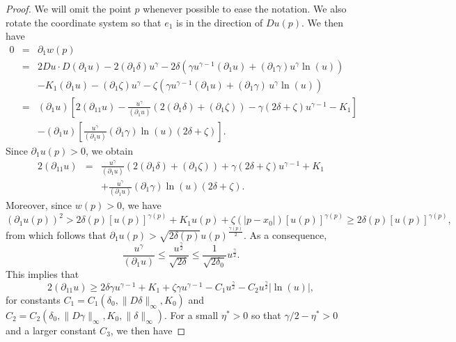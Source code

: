 \documentclass[reqno,11pt]{amsart}
\newcommand{\1}{\mathds{1}}
\numberwithin{equation}{section}
\begin{document}
\begin{proof}
We will omit the point $p$ whenever possible to ease the notation. We also rotate the coordinate system so that $e_1$ is in the direction of $Du(p)$. We then have
\begin{eqnarray*}
    0 & = & \partial_1 w(p)  \\
      & = &  2Du \cdot D\left(\partial_1u\right) - 2\left(\partial_1\delta\right) u^{\gamma} - 2\delta \left(\gamma u^{\gamma-1}\left(\partial_1u\right) + \left(\partial_1\gamma\right) u^\gamma \ln(u) \right) \\
      &  & - K_1\left(\partial_1u\right) - \left(\partial_1\zeta\right) u^\gamma - \zeta\left(\gamma u^{\gamma-1}\left(\partial_1u\right) + \left(\partial_1\gamma\right)\,u^\gamma \ln(u) \right)\\
      & = &   \left(\partial_1 u\right)\left[2\left(\partial_{11}u\right) - \frac{u^\gamma}{\left(\partial_1 u\right)}(2\left(\partial_1 \delta\right) + \left(\partial_1 \zeta\right)) - \gamma(2\delta + \zeta)u^{\gamma - 1} - K_1\right]\\
      & & -  \left(\partial_1 u\right) \left[ \frac{u^\gamma}{\left(\partial_1 u\right)}\left(\partial_1 \gamma\right) \ln(u)(2\delta  + \zeta)\right].
\end{eqnarray*}
Since $\partial_1u(p) >0$, we obtain
\begin{eqnarray*}
    2\left(\partial_{11}u\right) & = &\frac{u^\gamma}{\left(\partial_1 u\right)}(2\left(\partial_1\delta\right) + \left(\partial_1 \zeta\right)) + \gamma(2\delta + \zeta)u^{\gamma - 1} + K_1\\
    & & + \frac{u^\gamma}{\left(\partial_1 u\right)}\left(\partial_1 \gamma\right) \ln(u)(2\delta  + \zeta).
\end{eqnarray*}
Moreover, since $w(p)>0$, we have
$$
	\left(\partial_1 u(p)\right)^2 > 2\delta(p) [u(p)]^{\gamma(p)} + K_1 u(p) + \zeta(|p-x_0|) [u(p)]^{\gamma(p)} \geq 2\delta(p) [u(p)]^{\gamma(p)},
$$
from which follows that $\partial_1 u(p) > \sqrt{2\delta(p)}u(p)^{\frac{\gamma(p)}{2}}$. As a consequence,
$$
    \frac{u^\gamma}{\left(\partial_1 u\right)} \leq \frac{u^\frac{\gamma}{2}}{\sqrt{2\delta}} \leq \frac{1}{\sqrt{2\delta_0}} u^\frac{\gamma}{2}.
$$
This implies that
$$
    2\left(\partial_{11}u\right) \geq 2\delta \gamma u^{\gamma-1} + K_1 + \zeta \gamma u^{\gamma-1} - C_1 u^{\frac{\gamma}{2}} - C_2 u^{\frac{\gamma}{2}}|\ln(u)|,
$$
for constants $C_1 = C_1(\delta_0,\|D\delta\|_\infty,K_0)$ and $C_2 = C_2(\delta_0,\|D\gamma\|_\infty, K_0, \|\delta\|_\infty)$. For a small $\eta^\ast>0$ so that $\gamma/2 - \eta^\ast >0$ and a larger constant $C_3$, we then have

\end{proof}
\end{document}
